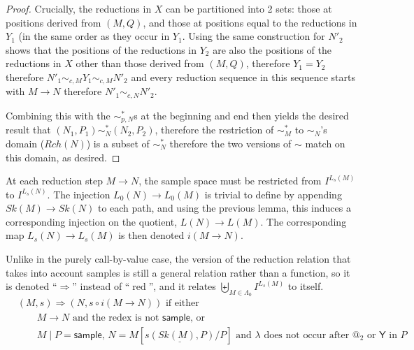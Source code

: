 \documentclass{article}
\newcommand{\tY}{\textsf{Y}}
\newcommand{\tsample}{\textsf{sample}}
\DeclareMathOperator{\red}{red}
\theoremstyle{definition}
\theoremstyle{lemma}
\theoremstyle{remark}
\begin{document}
\begin{proof}
Crucially, the reductions in $X$ can be partitioned into 2 sets: those at positions derived from $(M,Q)$, and those at positions equal to the reductions in $Y_1$ (in the same order as they occur in $Y_1$. Using the same construction for $N'_2$ shows that the positions of the reductions in $Y_2$ are also the positions of the reductions in $X$ other than those derived from $(M,Q)$, therefore $Y_1 = Y_2$ therefore $N'_1 \sim_{c,M} Y_1 \sim_{c,M} N'_2$ and every reduction sequence in this sequence starts with $M \to N$ therefore $N'_1 \sim_{c,N} N'_2$.

Combining this with the $\sim_{p,N}^*$s at the beginning and end then yields the desired result that $(N_1,P_1) \sim_N^* (N_2, P_2)$, therefore the restriction of $\sim_M^*$ to $\sim_N$'s domain ($Rch(N)$) is a subset of $\sim_N^*$ therefore the two versions of $\sim$ match on this domain, as desired.
\end{proof}



At each reduction step $M \to N$, the sample space must be restricted from $I^{L_s(M)}$ to $I^{L_s(N)}$. The injection $L_0(N) \to L_0(M)$ is trivial to define by appending $Sk(M) \to Sk(N)$ to each path, and using the previous lemma, this induces a corresponding injection on the quotient, $L(N) \to L(M)$. The corresponding map $L_s(N) \to L_s(M)$ is then denoted $i(M \to N)$.

Unlike in the purely call-by-value case, the version of the reduction relation that takes into account samples is still a general relation rather than a function, so it is denoted ``$\Rightarrow$'' instead of ``$\red$'', and it relates $\biguplus_{M \in \Lambda_0} I^{L_s(M)}$ to itself.
\begin{align*}
& (M,s) \Rightarrow (N,s \circ i(M \to N)) \text{ if either} \\
& \qquad \text{$M \to N$ and the redex is not $\tsample$, or} \\
& \qquad \text{$M \mid P = \tsample$, $N = M[\underline{s(Sk(M),P)}/P]$ and $\lambda$ does not occur after $@_2$ or $\tY$ in $P$}
\end{align*}
\end{document}
